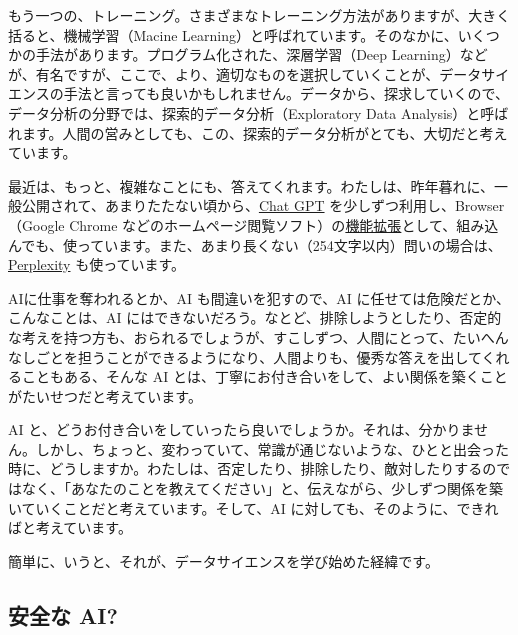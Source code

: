 \documentclass[
]{bxjsbook}
\theoremstyle{definition}
\theoremstyle{definition}
\theoremstyle{definition}
\theoremstyle{definition}
\theoremstyle{remark}
\begin{document}
もう一つの、トレーニング。さまざまなトレーニング方法がありますが、大きく括ると、機械学習（Macine Learning）と呼ばれています。そのなかに、いくつかの手法があります。プログラム化された、深層学習（Deep Learning）などが、有名ですが、ここで、より、適切なものを選択していくことが、データサイエンスの手法と言っても良いかもしれません。データから、探求していくので、データ分析の分野では、探索的データ分析（Exploratory Data Analysis）と呼ばれます。人間の営みとしても、この、探索的データ分析がとても、大切だと考えています。

最近は、もっと、複雑なことにも、答えてくれます。わたしは、昨年暮れに、一般公開されて、あまりたたない頃から、\href{https://openai.com/blog/chatgpt}{Chat GPT} を少しずつ利用し、Browser（Google Chrome などのホームページ閲覧ソフト）の\href{https://chrome.google.com/webstore/detail/chatgpt-for-google/jgjaeacdkonaoafenlfkkkmbaopkbilf}{機能拡張}として、組み込んでも、使っています。また、あまり長くない（254文字以内）問いの場合は、\href{https://www.perplexity.ai}{Perplexity} も使っています。

AIに仕事を奪われるとか、AI も間違いを犯すので、AI に任せては危険だとか、こんなことは、AI にはできないだろう。なとど、排除しようとしたり、否定的な考えを持つ方も、おられるでしょうが、すこしずつ、人間にとって、たいへんなしごとを担うことができるようになり、人間よりも、優秀な答えを出してくれることもある、そんな AI とは、丁寧にお付き合いをして、よい関係を築くことがたいせつだと考えています。

AI と、どうお付き合いをしていったら良いでしょうか。それは、分かりません。しかし、ちょっと、変わっていて、常識が通じないような、ひとと出会った時に、どうしますか。わたしは、否定したり、排除したり、敵対したりするのではなく、「あなたのことを教えてください」と、伝えながら、少しずつ関係を築いていくことだと考えています。そして、AI に対しても、そのように、できればと考えています。

簡単に、いうと、それが、データサイエンスを学び始めた経緯です。

\hypertarget{ux5b89ux5168ux306a-ai}{%
\subsection{安全な AI?}\label{ux5b89ux5168ux306a-ai}}
\end{document}
